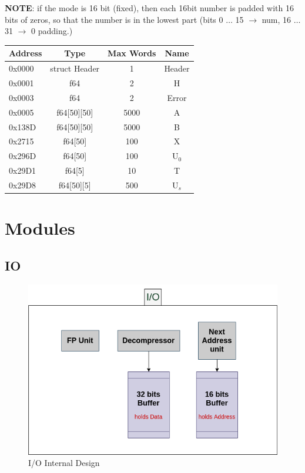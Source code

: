 \documentclass[12pt]{report}
\begin{document}
\textbf{NOTE}: if the mode is 16 bit (fixed), then each 16bit number is padded with 16 bits of zeros, so that the number is in the lowest part (bits 0 $\dots$ 15 $\rightarrow$ num, 16 $\dots$ 31 $\rightarrow$ 0 padding.)
\begin{center}
    \begin{tabular}{||l| c| c| c||} 
        \hline
        Address & Type & Max Words & Name  \\ [0.5ex] 
        \hline\hline
        0x0000 & struct Header & 1 & Header\\ 
        \hline
        0x0001 & f64 & 2 & H\\
        \hline
        0x0003 & f64 & 2 & Error\\
        \hline
        0x0005 & f64[50][50] & 5000 & A\\
        \hline
        0x138D & f64[50][50] & 5000 & B\\
        \hline
        0x2715 & f64[50] & 100 & X\\
        \hline
        0x296D & f64[50] & 100 & U$_0$\\
        \hline
        0x29D1 & f64[5] & 10 & T\\
        \hline
        0x29D8 & f64[50][5] & 500 & U$_s$\\
        \hline
       \end{tabular}
\end{center}

\section{Modules}

\subsection{IO}

\begin{figure}[hp]
    \centering
    \includegraphics[width=\textwidth]{images/IO}
    \caption{I/O Internal Design}
    \label{fig:io}
\end{figure}
\end{document}
